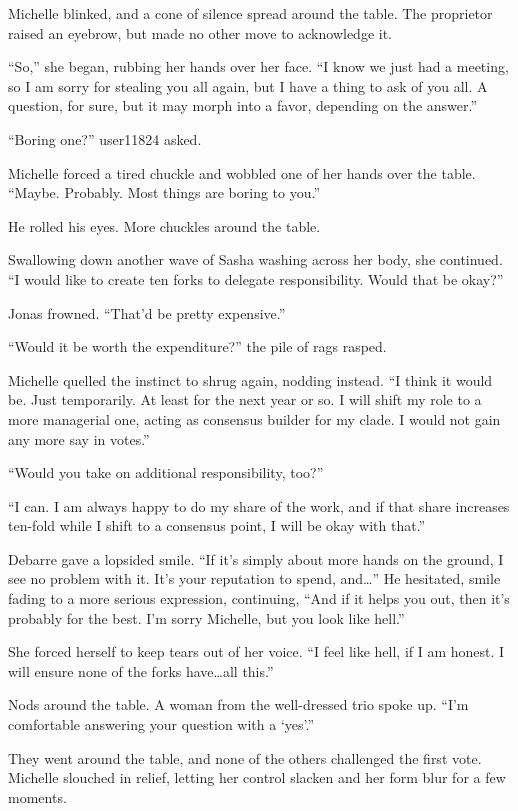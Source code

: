 Michelle blinked, and a cone of silence spread around the table. The proprietor raised an eyebrow, but made no other move to acknowledge it.

``So,'' she began, rubbing her hands over her face. ``I know we just had a meeting, so I am sorry for stealing you all again, but I have a thing to ask of you all. A question, for sure, but it may morph into a favor, depending on the answer.''

``Boring one?'' user11824 asked.

Michelle forced a tired chuckle and wobbled one of her hands over the table. ``Maybe. Probably. Most things are boring to you.''

He rolled his eyes. More chuckles around the table.

Swallowing down another wave of Sasha washing across her body, she continued. ``I would like to create ten forks to delegate responsibility. Would that be okay?''

Jonas frowned. ``That'd be pretty expensive.''

``Would it be worth the expenditure?'' the pile of rags rasped.

Michelle quelled the instinct to shrug again, nodding instead. ``I think it would be. Just temporarily. At least for the next year or so. I will shift my role to a more managerial one, acting as consensus builder for my clade. I would not gain any more say in votes.''

``Would you take on additional responsibility, too?''

``I can. I am always happy to do my share of the work, and if that share increases ten-fold while I shift to a consensus point, I will be okay with that.''

Debarre gave a lopsided smile. ``If it's simply about more hands on the ground, I see no problem with it. It's your reputation to spend, and\ldots{}'' He hesitated, smile fading to a more serious expression, continuing, ``And if it helps you out, then it's probably for the best. I'm sorry Michelle, but you look like hell.''

She forced herself to keep tears out of her voice. ``I feel like hell, if I am honest. I will ensure none of the forks have\ldots all this.''

Nods around the table. A woman from the well-dressed trio spoke up. ``I'm comfortable answering your question with a `yes'.''

They went around the table, and none of the others challenged the first vote. Michelle slouched in relief, letting her control slacken and her form blur for a few moments.

